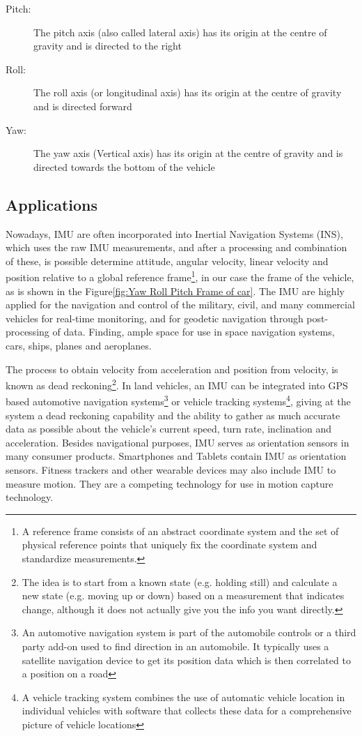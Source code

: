 \documentclass[tesi]{subfiles}
\begin{document}
\begin{description}
\item[Pitch:] The pitch axis (also called lateral axis) has its origin at the centre of gravity and is directed to the right
\item[Roll:] The roll axis (or longitudinal axis) has its origin at the centre of gravity and is directed forward
\item[Yaw:] The yaw axis (Vertical axis) has its origin at the centre of gravity and is directed towards the bottom of the vehicle
\end{description}



	
	
\subsection{Applications}\label{ssc:IMU Uses}
Nowadays, IMU are often incorporated into Inertial Navigation Systems (INS), which uses the raw IMU measurements, and after a processing and combination of these, is possible determine attitude, angular velocity, linear velocity and position relative to a global reference frame\footnote{A reference frame consists of an abstract coordinate system and the set of physical reference points that uniquely fix the coordinate system and standardize measurements.}, in our case the frame of the vehicle, as is shown in the Figure\ref{fig:Yaw Roll Pitch Frame of car}. 
The IMU are highly applied for the navigation and control of the military, civil, and many commercial vehicles for real-time monitoring, and for geodetic navigation through post-processing of data.
Finding, ample space for use in space navigation systems, cars, ships, planes and aeroplanes.

The process to obtain velocity from acceleration and position from velocity, is known as dead reckoning\footnote{The idea is to start from a known state (e.g. holding still) and calculate a new state (e.g. moving up or down) based on a measurement that indicates change, although it does not actually give you the info you want directly.}.
In land vehicles, an IMU can be integrated into GPS based automotive navigation systems\footnote{An automotive navigation system is part of the automobile controls or a third party add-on used to find direction in an automobile. It typically uses a satellite navigation device to get its position data which is then correlated to a position on a road} or vehicle tracking systems\footnote{A vehicle tracking system combines the use of automatic vehicle location in individual vehicles with software that collects these data for a comprehensive picture of vehicle locations}, giving at the system a dead reckoning capability and the ability to gather as much accurate data as possible about the vehicle's current speed, turn rate, inclination and acceleration. 
Besides navigational purposes, IMU serves as orientation sensors in many consumer products. Smartphones and Tablets contain IMU as orientation sensors. Fitness trackers and other wearable devices may also include IMU to measure motion.  They are a competing technology for use in motion capture technology\cite{motioncapture}.
\end{document}
